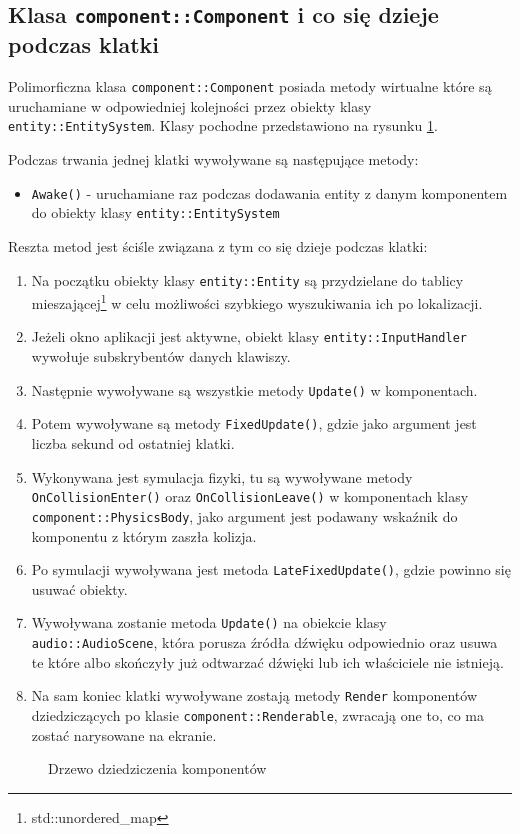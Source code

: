 \documentclass[a4paper,11pt]{article}
\begin{document}
\subsection{Klasa \texttt{component::Component} i co się dzieje podczas klatki}

Polimorficzna klasa \texttt{component::Component} posiada metody wirtualne które są uruchamiane w odpowiedniej kolejności przez obiekty klasy \texttt{entity::EntitySystem}. Klasy pochodne przedstawiono na rysunku \ref{rys:component}.

Podczas trwania jednej klatki wywoływane są następujące metody:

\begin{itemize}
    \item \texttt{Awake()} - uruchamiane raz podczas dodawania entity z danym komponentem do obiekty klasy \texttt{entity::EntitySystem}
\end{itemize}

Reszta metod jest ściśle związana z tym co się dzieje podczas klatki:

\begin{enumerate}
    \item Na początku obiekty klasy \texttt{entity::Entity} są przydzielane do tablicy mieszającej\footnote{std::unordered\_map} w celu możliwości szybkiego wyszukiwania ich po lokalizacji.
    \item Jeżeli okno aplikacji jest aktywne, obiekt klasy \texttt{entity::InputHandler} wywołuje subskrybentów danych klawiszy.
    \item Następnie wywoływane są wszystkie metody \texttt{Update()} w komponentach.
    \item Potem wywoływane są metody \texttt{FixedUpdate()}, gdzie jako argument jest liczba sekund od ostatniej klatki.
    \item Wykonywana jest symulacja fizyki, tu są wywoływane metody \texttt{OnCollisionEnter()} oraz \texttt{OnCollisionLeave()} w komponentach klasy \texttt{component::PhysicsBody}, jako argument jest podawany wskaźnik do komponentu z którym zaszła kolizja.
    \item Po symulacji wywoływana jest metoda \texttt{LateFixedUpdate()}, gdzie powinno się usuwać obiekty.
    \item Wywoływana zostanie metoda \texttt{Update()} na obiekcie klasy \texttt{audio::AudioScene}, która porusza źródła dźwięku odpowiednio oraz usuwa te które albo skończyły już odtwarzać dźwięki lub ich właściciele nie istnieją.
    \item Na sam koniec klatki wywoływane zostają metody \texttt{Render} komponentów dziedziczących po klasie \texttt{component::Renderable}, zwracają one to, co ma zostać narysowane na ekranie.
\end{enumerate}


\begin{figure}
    \resizebox{\textwidth}{!}{%
    }
    \centering
    \caption{Drzewo dziedziczenia komponentów}\label{rys:component}
\end{figure}
\end{document}

